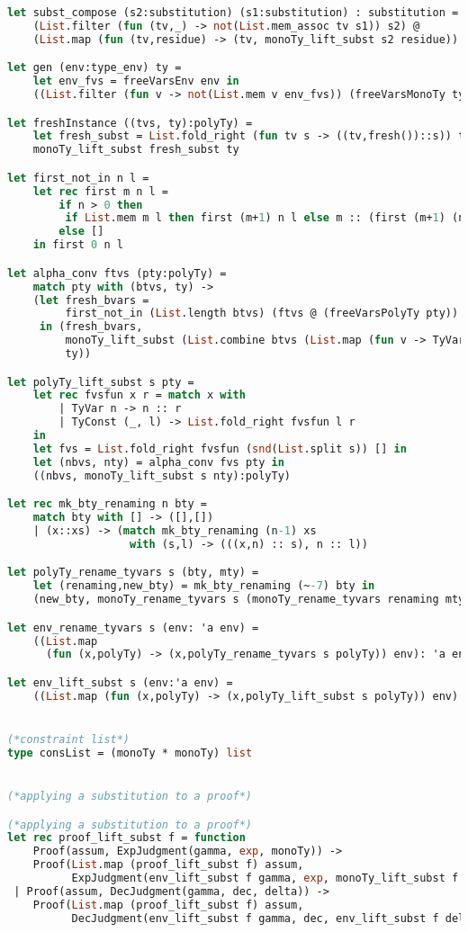 \begin{lstlisting}[language=Caml, caption=definitions.ml]
let subst_compose (s2:substitution) (s1:substitution) : substitution =
    (List.filter (fun (tv,_) -> not(List.mem_assoc tv s1)) s2) @ 
    (List.map (fun (tv,residue) -> (tv, monoTy_lift_subst s2 residue)) s1)

let gen (env:type_env) ty =
    let env_fvs = freeVarsEnv env in
    ((List.filter (fun v -> not(List.mem v env_fvs)) (freeVarsMonoTy ty), ty):polyTy)

let freshInstance ((tvs, ty):polyTy) =
    let fresh_subst = List.fold_right (fun tv s -> ((tv,fresh())::s)) tvs [] in
    monoTy_lift_subst fresh_subst ty

let first_not_in n l =
    let rec first m n l =
        if n > 0 then
         if List.mem m l then first (m+1) n l else m :: (first (m+1) (n - 1) l)
        else []
    in first 0 n l

let alpha_conv ftvs (pty:polyTy) =
    match pty with (btvs, ty) ->
    (let fresh_bvars =
         first_not_in (List.length btvs) (ftvs @ (freeVarsPolyTy pty))
     in (fresh_bvars,
         monoTy_lift_subst (List.combine btvs (List.map (fun v -> TyVar v) fresh_bvars))
         ty))

let polyTy_lift_subst s pty =
	let rec fvsfun x r = match x with
		| TyVar n -> n :: r
		| TyConst (_, l) -> List.fold_right fvsfun l r
	in
	let fvs = List.fold_right fvsfun (snd(List.split s)) [] in
    let (nbvs, nty) = alpha_conv fvs pty in
    ((nbvs, monoTy_lift_subst s nty):polyTy)

let rec mk_bty_renaming n bty =
    match bty with [] -> ([],[])
    | (x::xs) -> (match mk_bty_renaming (n-1) xs
                   with (s,l) -> (((x,n) :: s), n :: l))

let polyTy_rename_tyvars s (bty, mty) =
    let (renaming,new_bty) = mk_bty_renaming (~-7) bty in
    (new_bty, monoTy_rename_tyvars s (monoTy_rename_tyvars renaming mty))

let env_rename_tyvars s (env: 'a env) =
    ((List.map
      (fun (x,polyTy) -> (x,polyTy_rename_tyvars s polyTy)) env): 'a env)

let env_lift_subst s (env:'a env) =
    ((List.map (fun (x,polyTy) -> (x,polyTy_lift_subst s polyTy)) env):'a env)


(*constraint list*)
type consList = (monoTy * monoTy) list


(*applying a substitution to a proof*)

(*applying a substitution to a proof*)
let rec proof_lift_subst f = function
    Proof(assum, ExpJudgment(gamma, exp, monoTy)) ->
    Proof(List.map (proof_lift_subst f) assum,
          ExpJudgment(env_lift_subst f gamma, exp, monoTy_lift_subst f monoTy))
 | Proof(assum, DecJudgment(gamma, dec, delta)) ->
    Proof(List.map (proof_lift_subst f) assum,
          DecJudgment(env_lift_subst f gamma, dec, env_lift_subst f delta))


\end{lstlisting}
